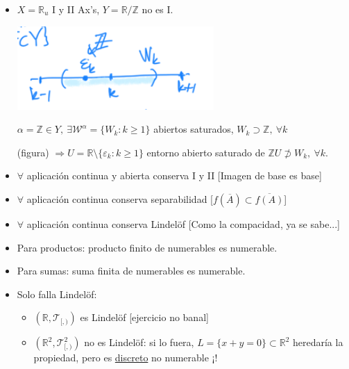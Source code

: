 \begin{itemize}
    \item $X = \mathbb{R}_u$ I y II Ax's, $Y = \mathbb{R}/\mathbb{Z}$ no es I.
    \begin{center}
        \includegraphics[scale=0.3]{images/ej_axiomas_num_real} 
    \end{center}
    \begin{demo}
        $\alpha = \mathbb{Z} \in Y,\ \exists \mathcal{W}^{\alpha} = \{W_k : k \ge 1\}$ abiertos saturados, $W_k \supset \mathbb{Z},\ \forall k$

        (figura) $\Rightarrow U = \mathbb{R} \setminus \{\varepsilon_k : k \ge 1\}$ entorno abierto saturado de $\mathbb{Z} U \not \supset W_k,\ \forall k$.
    \end{demo}

    \item $\forall$ aplicación continua y abierta conserva I y II [Imagen de base es base]
    \item $\forall $ aplicación continua conserva separabilidad [$f\left( \overline{A} \right) \subset \overline{f\left( A \right)}$]
    \item $\forall$ aplicación continua conserva Lindelöf [Como la compacidad, ya se sabe...]
\end{itemize}

\begin{itemize}
    \item Para productos: producto finito de numerables es numerable.
    \item Para sumas: suma finita de numerables es numerable.
    \item Solo falla Lindelöf:
    \begin{itemize}
        \item $\left( \mathbb{R}, \mathcal{T}_{[, )} \right)$ es Lindelöf [ejercicio no banal]
        \item $\left( \mathbb{R}^2, \mathcal{T}_{[, )}^2 \right)$ no es Lindelöf: si lo fuera, $L = \{x + y = 0\} \subset \mathbb{R}^2$ heredaría la propiedad, pero es \underline{discreto} no numerable ¡!
    \end{itemize}
\end{itemize}
